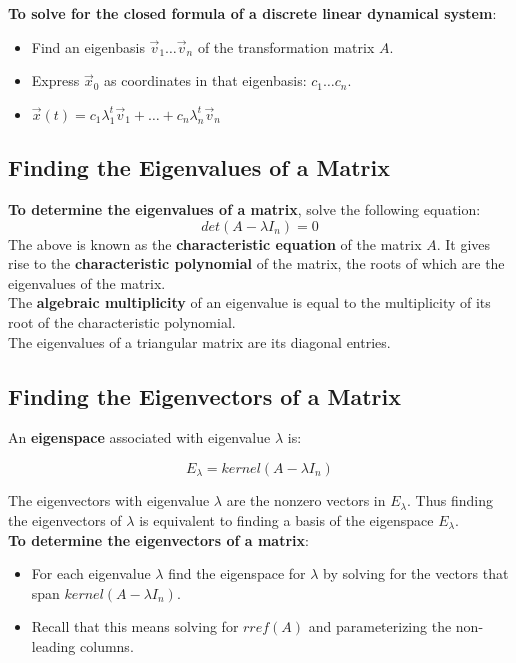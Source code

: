 \documentclass[]{scrartcl}
\begin{document}
	\textbf{To solve for the closed formula of a discrete linear dynamical system}:
	\begin{itemize}
		\item Find an eigenbasis $\vec{v}_1 \ldots \vec{v}_n$ of the transformation matrix $A$.
		\item Express $\vec{x}_0$ as coordinates in that eigenbasis: $c_1 \ldots c_n$.
		\item $\vec{x}(t) = c_1 \lambda_1^t \vec{v}_1 + \ldots + c_n \lambda_n^t \vec{v}_n$
	\end{itemize}
	
	\subsection{Finding the Eigenvalues of a Matrix}
	
	\textbf{To determine the eigenvalues of a matrix}, solve the following equation:
	$$ det(A - \lambda I_n) = 0 $$
	The above is known as the \textbf{characteristic equation} of the matrix $A$. It gives rise to the \textbf{characteristic polynomial} of the matrix, the roots of which are the eigenvalues of the matrix.\\
	
	The \textbf{algebraic multiplicity} of an eigenvalue is equal to the multiplicity of its root of the characteristic polynomial.\\
	
	The eigenvalues of a triangular matrix are its diagonal entries.\\
	
	\subsection{Finding the Eigenvectors of a Matrix}
	An \textbf{eigenspace} associated with eigenvalue $\lambda$ is:
	
	$$
	E_\lambda = kernel(A - \lambda I_n)
	$$
	
	The eigenvectors with eigenvalue $\lambda$ are the nonzero vectors in $E_\lambda$. Thus finding the eigenvectors of $\lambda$ is equivalent to finding a basis of the eigenspace $E_\lambda$.\\
	
	\textbf{To determine the eigenvectors of a matrix}:
	\begin{itemize}
		\item For each eigenvalue $\lambda$ find the eigenspace for $\lambda$ by solving for the vectors that span $kernel(A - \lambda I_n)$.
		\item Recall that this means solving for $rref(A)$ and parameterizing the non-leading columns.
	\end{itemize}
	
\end{document}
